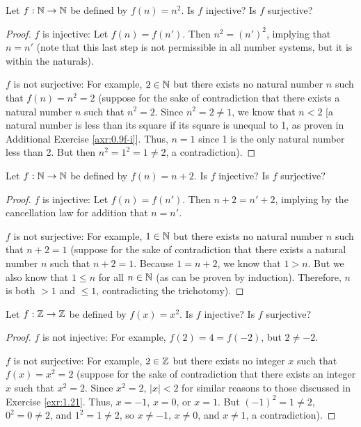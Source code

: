 \documentclass[../main.tex]{subfiles}
\begin{document}
\begin{exercise}\label{exr:1.21}
    Let $f:\mathbb{N}\to\mathbb{N}$ be defined by $f(n)=n^2$. Is $f$ injective? Is $f$ surjective?
    \begin{proof}
        $f$ is injective: Let $f(n)=f(n')$. Then $n^2=(n')^2$, implying that $n=n'$ (note that this last step is not permissible in all number systems, but it is within the naturals).\par
        $f$ is not surjective: For example, $2\in\mathbb{N}$ but there exists no natural number $n$ such that $f(n)=n^2=2$ (suppose for the sake of contradiction that there exists a natural number $n$ such that $n^2=2$. Since $n^2=2\neq 1$, we know that $n<2$ [a natural number is less than its square if its square is unequal to 1, as proven in Additional Exercise \ref{axr:0.9f-i}]. Thus, $n=1$ since 1 is the only natural number less than 2. But then $n^2=1^2=1\neq 2$, a contradiction).
    \end{proof}
\end{exercise}

\begin{exercise}\label{exr:1.22}
    Let $f:\mathbb{N}\to\mathbb{N}$ be defined by $f(n)=n+2$. Is $f$ injective? Is $f$ surjective?
    \begin{proof}
        $f$ is injective: Let $f(n)=f(n')$. Then $n+2=n'+2$, implying by the cancellation law for addition that $n=n'$.\par
        $f$ is not surjective: For example, $1\in\mathbb{N}$ but there exists no natural number $n$ such that $n+2=1$ (suppose for the sake of contradiction that there exists a natural number $n$ such that $n+2=1$. Because $1=n+2$, we know that $1>n$. But we also know that $1\leq n$ for all $n\in\mathbb{N}$ (as can be proven by induction). Therefore, $n$ is both $>1$ and $\leq 1$, contradicting the trichotomy).
    \end{proof}
\end{exercise}

\begin{exercise}\label{exr:1.23}
    Let $f:\mathbb{Z}\to\mathbb{Z}$ be defined by $f(x)=x^2$. Is $f$ injective? Is $f$ surjective?
    \begin{proof}
        $f$ is not injective: For example, $f(2)=4=f(-2)$, but $2\neq -2$.\par
        $f$ is not surjective: For example, $2\in\mathbb{Z}$ but there exists no integer $x$ such that $f(x)=x^2=2$ (suppose for the sake of contradiction that there exists an integer $x$ such that $x^2=2$. Since $x^2=2$, $|x|<2$ for similar reasons to those discussed in Exercise \ref{exr:1.21}. Thus, $x=-1$, $x=0$, or $x=1$. But $(-1)^2=1\neq 2$, $0^2=0\neq 2$, and $1^2=1\neq 2$, so $x\neq -1$, $x\neq 0$, and $x\neq 1$, a contradiction).
    \end{proof}
\end{exercise}
\end{document}
